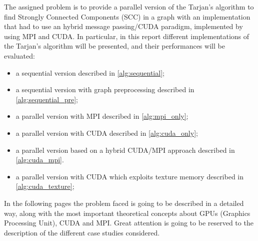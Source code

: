 The assigned problem is to provide a parallel version of the Tarjan's algorithm to find Strongly Connected Components (SCC) in a graph with an implementation that had to use an hybrid message passing/CUDA paradigm, implemented by using MPI and CUDA.
In particular, in this report different implementations of the Tarjan's algorithm will be presented, and their performances will be evaluated:
\begin{itemize}
    \item a sequential version described in \ref{alg:sequential};
    \item a sequential version with graph preprocessing described in \ref{alg:sequential_pre};
    \item a parallel version with MPI described in \ref{alg:mpi_only};
    \item a parallel version with CUDA described in \ref{alg:cuda_only};
    \item a parallel version based on a hybrid CUDA/MPI approach described in \ref{alg:cuda_mpi}.
    \item a parallel version with CUDA which exploits texture memory described in \ref{alg:cuda_texture};
\end{itemize}

In the following pages the problem faced is going to be described in a detailed way, along with the most important theoretical concepts about GPUs (Graphics Processing Unit), 
CUDA and MPI.
Great attention is going to be reserved to the description of the different case studies considered. 
